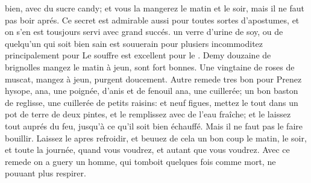 bien, avec du sucre candy\protect{}; et vous la mangerez le matin et le soir, mais il ne faut pas boir apr\'{e}s. Ce secret est admirable aussi pour toutes sortes d'apostumes\protect{}, et on s'en est tousjours servi avec grand succ\'{e}s.
\pend%
\newpage
\pstart%
 un verre d'urine\protect{} de soy, ou de quelqu'un qui soit bien sain est souuerain pour plusiers incommoditez principalement pour \protect{}
\pend%
\pstart%
Le souffre\protect{} est excellent pour le \protect{}.
\pend%
\pstart%
Demy douzaine de brignolles\protect{} mangez le matin \`{a} jeun, sont fort bonnes.
\pend%
\pstart%
Une vingtaine de roses de muscat\protect{}, mangez \`{a} jeun, purgent doucement.%
\pend%
\pstart%
Autre remede tres bon pour\protect{}
Prenez 
hysope\protect{}, ana, une poign\'{e}e, d'anis\protect{} et de fenouil\protect{} ana, une cuiller\'{e}e; un bon baston de reglisse\protect{}, une cuiller\'{e}e de petits raisins\protect{}: et neuf figues\protect{}, mettez le tout dans un pot de terre de deux pintes, et le remplissez avec de l'eau fra\^{i}che; et le laissez tout aupr\'{e}s du feu, jusqu'\`{a} ce qu'il soit bien \'{e}chauff\'{e}. Mais il ne faut pas le faire bouillir. Laissez le apres refroidir, et beuuez de cela un bon coup le matin, le soir, et toute la journ\'{e}e, quand vous voudrez, et autant que vous voudrez. Avec ce remede on a guery un homme, qui tomboit quelques fois comme mort, ne pouuant plus respirer.
